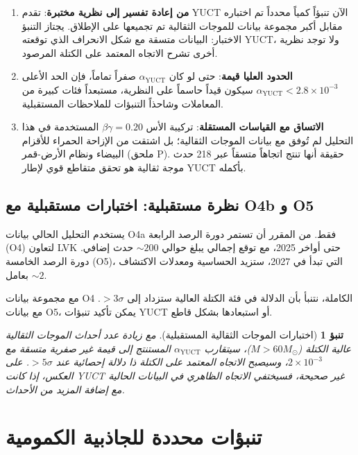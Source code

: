 \documentclass[11pt,a4paper]{article}
\newtheorem{prediction}[theorem]{تنبؤ}
\theoremstyle{remark}
\begin{document}
	\begin{enumerate}
		\item \textbf{من إعادة تفسير إلى نظرية مختبرة}: تقدم YUCT الآن تنبؤاً كمياً محدداً تم اختباره مقابل أكبر مجموعة بيانات للموجات الثقالية تم تجميعها على الإطلاق. يجتاز التنبؤ الاختبار: البيانات متسقة مع شكل الانحراف الذي توقعته YUCT، ولا توجد نظرية أخرى تشرح الاتجاه المعتمد على الكتلة المرصود.
		
		\item \textbf{الحدود العليا قيمة}: حتى لو كان $\alpha_{\text{YUCT}}$ صفراً تماماً، فإن الحد الأعلى $\alpha_{\text{YUCT}} < 2.8 \times 10^{-3}$ سيكون قيداً حاسماً على النظرية، مستبعداً فئات كبيرة من المعاملات وشاحذاً التنبؤات للملاحظات المستقبلية.
		
		\item \textbf{الاتساق مع القياسات المستقلة}: تركيبة الأس $\beta\gamma = 0.20$ المستخدمة في هذا التحليل لم تُوفق مع بيانات الموجات الثقالية؛ بل اشتقت من الإزاحة الحمراء للأقزام البيضاء ونظام الأرض-قمر (ملحق P). حقيقة أنها تنتج اتجاهاً متسقاً عبر 218 حدث موجة ثقالية هو تحقق متقاطع قوي لإطار YUCT بأكمله.
	\end{enumerate}
	
	\subsection{نظرة مستقبلية: اختبارات مستقبلية مع O4b و O5}
	
	يستخدم التحليل الحالي بيانات O4a فقط. من المقرر أن تستمر دورة الرصد الرابعة (O4) لتعاون LVK حتى أواخر 2025، مع توقع إجمالي يبلغ حوالي $\sim 200$ حدث إضافي. دورة الرصد الخامسة (O5)، التي تبدأ في 2027، ستزيد الحساسية ومعدلات الاكتشاف بعامل $\sim 2$.
	
	مع مجموعة بيانات O4 الكاملة، نتنبأ بأن الدلالة في فئة الكتلة العالية ستزداد إلى $> 3\sigma$. مع بيانات O5، يمكن تأكيد تنبؤات YUCT أو استبعادها بشكل قاطع.
	
	\begin{prediction}[اختبارات الموجات الثقالية المستقبلية]
		مع زيادة عدد أحداث الموجات الثقالية عالية الكتلة ($M > 60 M_\odot$)، سيتقارب $\alpha_{\text{YUCT}}$ المستنتج إلى قيمة غير صفرية متسقة مع $2\times 10^{-3}$، وسيصبح الاتجاه المعتمد على الكتلة ذا دلالة إحصائية عند $> 5\sigma$. على العكس، إذا كانت YUCT غير صحيحة، فسيختفي الاتجاه الظاهري في البيانات الحالية مع إضافة المزيد من الأحداث.
	\end{prediction}
	
	\section{تنبؤات محددة للجاذبية الكمومية}
	\label{sec:predictions}
	
\end{document}
